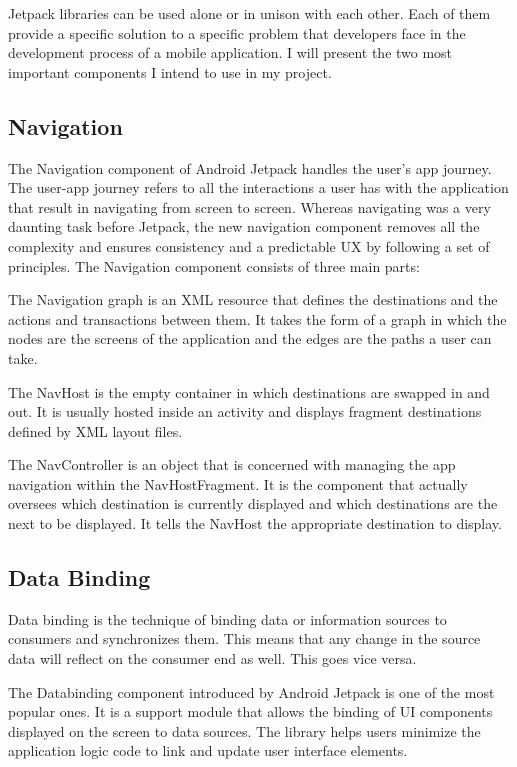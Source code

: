 \documentclass[12pt,a4paper,twoside]{report}
\begin{document}
Jetpack libraries can be used alone or in unison with each other. Each of them provide a specific solution to a specific problem that developers face in the development process of a mobile application. I will present the two most important components I intend to use in my project.

\subsection{Navigation}
The Navigation component of Android Jetpack handles the user's app journey. The user-app journey refers to all the interactions a user has with the application that result in navigating from screen to screen. Whereas navigating was a very daunting task before Jetpack, the new navigation component removes all the complexity and ensures consistency and a predictable UX by following a set of principles. The Navigation component consists of three main parts:

The Navigation graph is an XML resource that defines the destinations and the actions and transactions between them. It takes the form of a graph in which the nodes are the screens of the application and the edges are the paths a user can take.

The NavHost is the empty container in which destinations are swapped in and out. It is usually hosted inside an activity and displays fragment destinations defined by XML layout files.

The NavController is an object that is concerned with managing the app navigation within the NavHostFragment. It is the component that actually oversees which destination is currently displayed and which destinations are the next to be displayed. It tells the NavHost the appropriate destination to display.

\subsection{Data Binding}
Data binding is the technique of binding data or information sources to consumers and synchronizes them. This means that any change in the source data will reflect on the consumer end as well. This goes vice versa. 

The Databinding component introduced by Android Jetpack is one of the most popular ones. It is a support module that allows the binding of UI components displayed on the screen to data sources. The library helps users minimize the application logic code to link and update user interface elements.
\end{document}
